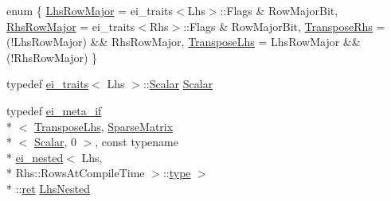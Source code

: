 \begin{DoxyCompactItemize}
\item 
enum \{ \hyperlink{struct_sparse_product_return_type_3_01_lhs_00_01_rhs_00_01_sparse_time_sparse_product_01_4_a125937488499be7d1fd0fdc811d8b53ea046449c3ce050236e4c6602e5c55918b}{Lhs\-Row\-Major} = ei\-\_\-traits$<$Lhs$>$\-:\-:Flags \& Row\-Major\-Bit, 
\hyperlink{struct_sparse_product_return_type_3_01_lhs_00_01_rhs_00_01_sparse_time_sparse_product_01_4_a125937488499be7d1fd0fdc811d8b53eaf0818a2814501606a19cd0b30f757f8a}{Rhs\-Row\-Major} = ei\-\_\-traits$<$Rhs$>$\-:\-:Flags \& Row\-Major\-Bit, 
\hyperlink{struct_sparse_product_return_type_3_01_lhs_00_01_rhs_00_01_sparse_time_sparse_product_01_4_a125937488499be7d1fd0fdc811d8b53ea4a2f6d251efbbf832a56a1a293f821de}{Transpose\-Rhs} = (!\-Lhs\-Row\-Major) \&\& Rhs\-Row\-Major, 
\hyperlink{struct_sparse_product_return_type_3_01_lhs_00_01_rhs_00_01_sparse_time_sparse_product_01_4_a125937488499be7d1fd0fdc811d8b53ea289efa99a23a97c2380944cbc1f3efdb}{Transpose\-Lhs} = Lhs\-Row\-Major \&\& (!\-Rhs\-Row\-Major)
 \}
\item 
typedef \hyperlink{structei__traits}{ei\-\_\-traits}$<$ Lhs $>$\-::\hyperlink{struct_sparse_product_return_type_3_01_lhs_00_01_rhs_00_01_sparse_time_sparse_product_01_4_a2289d55762c6c97f479a08596a6f4f0e}{Scalar} \hyperlink{struct_sparse_product_return_type_3_01_lhs_00_01_rhs_00_01_sparse_time_sparse_product_01_4_a2289d55762c6c97f479a08596a6f4f0e}{Scalar}
\item 
typedef \hyperlink{structei__meta__if}{ei\-\_\-meta\-\_\-if}\\*
$<$ \hyperlink{struct_sparse_product_return_type_3_01_lhs_00_01_rhs_00_01_sparse_time_sparse_product_01_4_a125937488499be7d1fd0fdc811d8b53ea289efa99a23a97c2380944cbc1f3efdb}{Transpose\-Lhs}, \hyperlink{class_sparse_matrix}{Sparse\-Matrix}\\*
$<$ \hyperlink{struct_sparse_product_return_type_3_01_lhs_00_01_rhs_00_01_sparse_time_sparse_product_01_4_a2289d55762c6c97f479a08596a6f4f0e}{Scalar}, 0 $>$, const typename \\*
\hyperlink{structei__nested}{ei\-\_\-nested}$<$ Lhs, \\*
Rhs\-::\-Rows\-At\-Compile\-Time $>$\-::\hyperlink{glext_8h_a7d05960f4f1c1b11f3177dc963a45d86}{type} $>$\\*
\-::\hyperlink{group___i_p_conn_plugin_gabc99fe6afec1a75ccff1092e47375a40}{ret} \hyperlink{struct_sparse_product_return_type_3_01_lhs_00_01_rhs_00_01_sparse_time_sparse_product_01_4_a9291f9481846fe6baef1c645df03180a}{Lhs\-Nested}

\end{DoxyCompactItemize}
